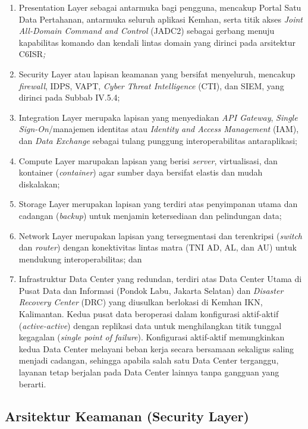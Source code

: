 \begin{enumerate}[label=\alph*.]
  \item Presentation Layer sebagai antarmuka bagi pengguna, mencakup Portal Satu Data Pertahanan, antarmuka seluruh aplikasi Kemhan, serta titik akses \textit{Joint All-Domain Command and Control} (JADC2) sebagai gerbang menuju kapabilitas komando dan kendali lintas domain yang dirinci pada arsitektur C6ISR\textit{;}
  \item Security Layer atau lapisan keamanan yang bersifat menyeluruh, mencakup \textit{firewall}, IDPS, VAPT, \textit{Cyber Threat Intelligence} (CTI), dan SIEM, yang dirinci pada Subbab IV.5.4;
  \item Integration Layer merupaka lapisan yang menyediakan \textit{API Gateway}, \textit{Single Sign-On}/manajemen identitas atau \textit{Identity and Access Management} (IAM), dan \textit{Data Exchange} sebagai tulang punggung interoperabilitas antaraplikasi;
  \item Compute Layer marupakan lapisan yang berisi \textit{server}, virtualisasi, dan kontainer (\textit{container}) agar sumber daya bersifat elastis dan mudah diskalakan;
  \item Storage Layer merupakan lapisan yang terdiri atas penyimpanan utama dan cadangan (\textit{backup}) untuk menjamin ketersediaan dan pelindungan data;
  \item Network Layer merupakan lapisan yang tersegmentasi dan terenkripsi (\textit{switch} dan \textit{router}) dengan konektivitas lintas matra (TNI AD, AL, dan AU) untuk mendukung interoperabilitas; dan
  \item Infrastruktur Data Center yang redundan, terdiri atas Data Center Utama di Pusat Data dan Informasi (Pondok Labu, Jakarta Selatan) dan \textit{Disaster Recovery Center} (DRC) yang diusulkan berlokasi di Kemhan IKN, Kalimantan. Kedua pusat data beroperasi dalam konfigurasi aktif-aktif (\textit{active-active}) dengan replikasi data untuk menghilangkan titik tunggal kegagalan (\textit{single point of failure}). Konfigurasi aktif-aktif memungkinkan kedua Data Center melayani beban kerja secara bersamaan sekaligus saling menjadi cadangan, sehingga apabila salah satu Data Center terganggu, layanan tetap berjalan pada Data Center lainnya tanpa gangguan yang berarti.
\end{enumerate}

\subsection{Arsitektur Keamanan (Security Layer)}

